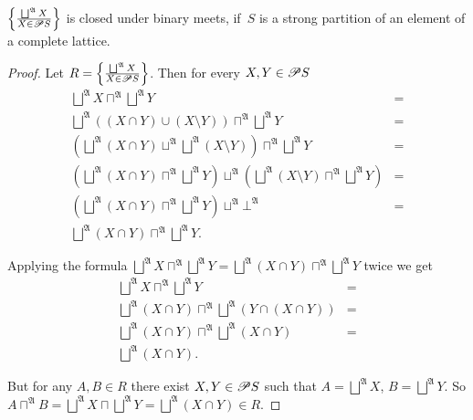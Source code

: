 \begin{prop}
$\setcond{\bigsqcup^{\mathfrak{A}}X}{X\in\subsets S}$ is closed under
binary meets, if~$S$ is a strong partition of an element of a complete lattice.\end{prop}
\begin{proof}
Let $R=\setcond{\bigsqcup^{\mathfrak{A}}X}{X\in\subsets S}$. Then
for every $X,Y\in\mathscr{P} S$
\begin{align*}
\bigsqcup^{\mathfrak{A}}X\sqcap^{\mathfrak{A}}\bigsqcup^{\mathfrak{A}}Y & =\\
\bigsqcup^{\mathfrak{A}}((X\cap Y)\cup(X\setminus Y))\sqcap^{\mathfrak{A}}\bigsqcup^{\mathfrak{A}}Y & =\\
\left(\bigsqcup^{\mathfrak{A}}(X\cap Y)\sqcup^{\mathfrak{A}}\bigsqcup^{\mathfrak{A}}(X\setminus Y)\right)\sqcap^{\mathfrak{A}}\bigsqcup^{\mathfrak{A}}Y & =\\
\left(\bigsqcup^{\mathfrak{A}}(X\cap Y)\sqcap^{\mathfrak{A}}\bigsqcup^{\mathfrak{A}}Y\right)\sqcup^{\mathfrak{A}}\left(\bigsqcup^{\mathfrak{A}}(X\setminus Y)\sqcap^{\mathfrak{A}}\bigsqcup^{\mathfrak{A}}Y\right) & =\\
\left(\bigsqcup^{\mathfrak{A}}(X\cap Y)\sqcap^{\mathfrak{A}}\bigsqcup^{\mathfrak{A}}Y\right)\sqcup^{\mathfrak{A}}\bot^{\mathfrak{A}} & =\\
\bigsqcup^{\mathfrak{A}}(X\cap Y)\sqcap^{\mathfrak{A}}\bigsqcup^{\mathfrak{A}}Y.
\end{align*}


Applying the formula $\bigsqcup^{\mathfrak{A}}X\sqcap^{\mathfrak{A}}\bigsqcup^{\mathfrak{A}}Y=\bigsqcup^{\mathfrak{A}}(X\cap Y)\sqcap^{\mathfrak{A}}\bigsqcup^{\mathfrak{A}}Y$
twice we get
\begin{align*}
\bigsqcup^{\mathfrak{A}}X\sqcap^{\mathfrak{A}}\bigsqcup^{\mathfrak{A}}Y & =\\
\bigsqcup^{\mathfrak{A}}(X\cap Y)\sqcap^{\mathfrak{A}}\bigsqcup^{\mathfrak{A}}(Y\cap(X\cap Y)) & =\\
\bigsqcup^{\mathfrak{A}}(X\cap Y)\sqcap^{\mathfrak{A}}\bigsqcup^{\mathfrak{A}}(X\cap Y) & =\\
\bigsqcup^{\mathfrak{A}}(X\cap Y).
\end{align*}


But for any $A,B\in R$ there exist $X,Y\in\mathscr{P} S$ such that
$A=\bigsqcup^{\mathfrak{A}}X$, $B=\bigsqcup^{\mathfrak{A}}Y$. So
$A\sqcap^{\mathfrak{A}}B=\bigsqcup^{\mathfrak{A}}X\sqcap\bigsqcup^{\mathfrak{A}}Y=\bigsqcup^{\mathfrak{A}}(X\cap Y)\in R$.
\end{proof}

